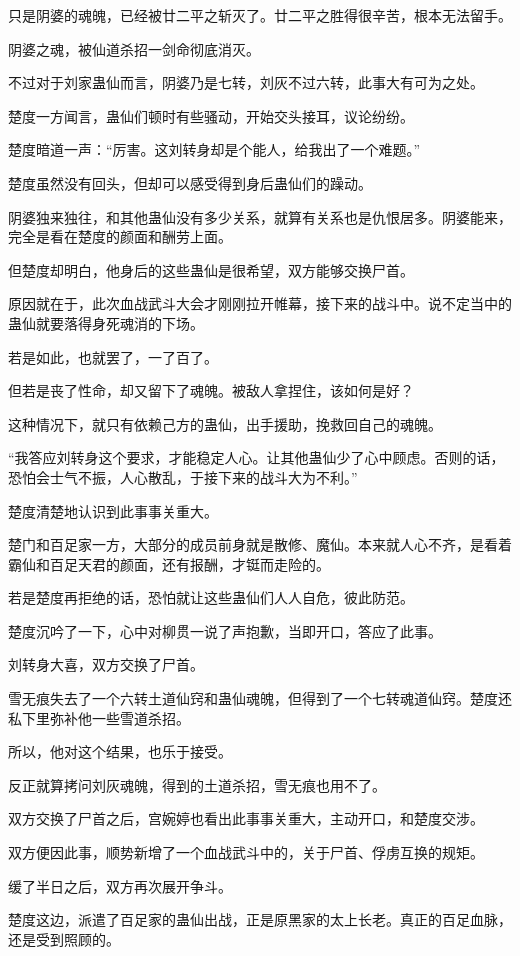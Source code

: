 \begin{this_body}
只是阴婆的魂魄，已经被廿二平之斩灭了。廿二平之胜得很辛苦，根本无法留手。

阴婆之魂，被仙道杀招一剑命彻底消灭。

不过对于刘家蛊仙而言，阴婆乃是七转，刘灰不过六转，此事大有可为之处。

楚度一方闻言，蛊仙们顿时有些骚动，开始交头接耳，议论纷纷。

楚度暗道一声：“厉害。这刘转身却是个能人，给我出了一个难题。”

楚度虽然没有回头，但却可以感受得到身后蛊仙们的躁动。

阴婆独来独往，和其他蛊仙没有多少关系，就算有关系也是仇恨居多。阴婆能来，完全是看在楚度的颜面和酬劳上面。

但楚度却明白，他身后的这些蛊仙是很希望，双方能够交换尸首。

原因就在于，此次血战武斗大会才刚刚拉开帷幕，接下来的战斗中。说不定当中的蛊仙就要落得身死魂消的下场。

若是如此，也就罢了，一了百了。

但若是丧了性命，却又留下了魂魄。被敌人拿捏住，该如何是好？

这种情况下，就只有依赖己方的蛊仙，出手援助，挽救回自己的魂魄。

“我答应刘转身这个要求，才能稳定人心。让其他蛊仙少了心中顾虑。否则的话，恐怕会士气不振，人心散乱，于接下来的战斗大为不利。”

楚度清楚地认识到此事事关重大。

楚门和百足家一方，大部分的成员前身就是散修、魔仙。本来就人心不齐，是看着霸仙和百足天君的颜面，还有报酬，才铤而走险的。

若是楚度再拒绝的话，恐怕就让这些蛊仙们人人自危，彼此防范。

楚度沉吟了一下，心中对柳贯一说了声抱歉，当即开口，答应了此事。

刘转身大喜，双方交换了尸首。

雪无痕失去了一个六转土道仙窍和蛊仙魂魄，但得到了一个七转魂道仙窍。楚度还私下里弥补他一些雪道杀招。

所以，他对这个结果，也乐于接受。

反正就算拷问刘灰魂魄，得到的土道杀招，雪无痕也用不了。

双方交换了尸首之后，宫婉婷也看出此事事关重大，主动开口，和楚度交涉。

双方便因此事，顺势新增了一个血战武斗中的，关于尸首、俘虏互换的规矩。

缓了半日之后，双方再次展开争斗。

楚度这边，派遣了百足家的蛊仙出战，正是原黑家的太上长老。真正的百足血脉，还是受到照顾的。


\end{this_body}

